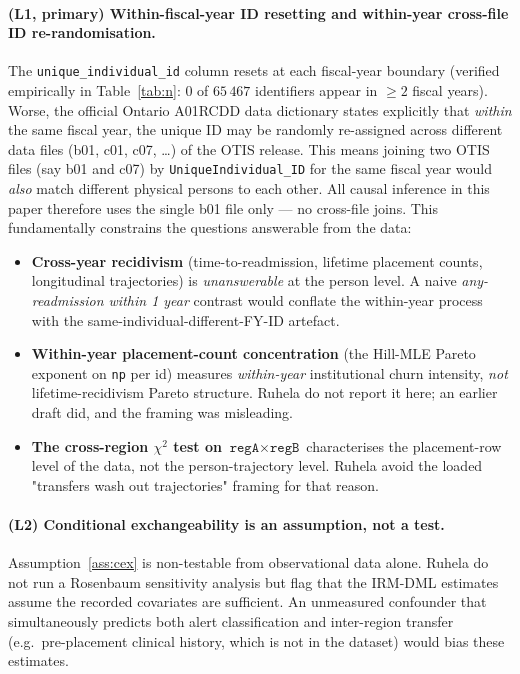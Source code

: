\documentclass[11pt,a4paper]{article}
\newcommand{\1}{\mathbf{1}}
\theoremstyle{plain}
\theoremstyle{definition}
\begin{document}
\paragraph{(L1, primary) Within-fiscal-year ID resetting and
within-year cross-file ID re-randomisation.}  The
\texttt{unique\_individual\_id} column resets at each fiscal-year
boundary (verified empirically in Table~\ref{tab:n}: $0$ of
$65\,467$ identifiers appear in $\ge 2$ fiscal years).  Worse,
the official Ontario A01RCDD data dictionary states explicitly
that \emph{within} the same fiscal year, the unique ID may be
randomly re-assigned across different data files (b01, c01, c07,
\ldots) of the OTIS release.  This means joining two OTIS files
(say b01 and c07) by \texttt{UniqueIndividual\_ID} for the same
fiscal year would \emph{also} match different physical persons
to each other.  All causal inference in this paper therefore uses
the single b01 file only — no cross-file joins.  This
fundamentally constrains the questions answerable from the data:
\begin{itemize}
\setlength{\itemsep}{1pt}
\item \textbf{Cross-year recidivism} (time-to-readmission, lifetime
      placement counts, longitudinal trajectories) is
      \emph{unanswerable} at the person level.  A naive
      \emph{any-readmission within 1 year} contrast would conflate
      the within-year process with the
      same-individual-different-FY-ID artefact.
\item \textbf{Within-year placement-count concentration} (the
      Hill-MLE Pareto exponent on \texttt{np} per id) measures
      \emph{within-year} institutional churn intensity, \emph{not}
      lifetime-recidivism Pareto structure.  Ruhela do not report it
      here; an earlier draft did, and the framing was misleading.
\item \textbf{The cross-region $\chi^2$ test on
      $\texttt{regA}\times\texttt{regB}$} characterises the
      placement-row level of the data, not the person-trajectory
      level.  Ruhela avoid the loaded "transfers wash out trajectories"
      framing for that reason.
\end{itemize}

\paragraph{(L2) Conditional exchangeability is an assumption, not a
test.}  Assumption~\ref{ass:cex} is non-testable from observational
data alone.  Ruhela do not run a Rosenbaum sensitivity analysis
\cite{rosenbaum2002obs} but flag that the IRM-DML estimates assume
the recorded covariates are sufficient.  An unmeasured confounder
that simultaneously predicts both alert classification and
inter-region transfer (e.g.\ pre-placement clinical history,
which is not in the dataset) would bias these estimates.
\end{document}
